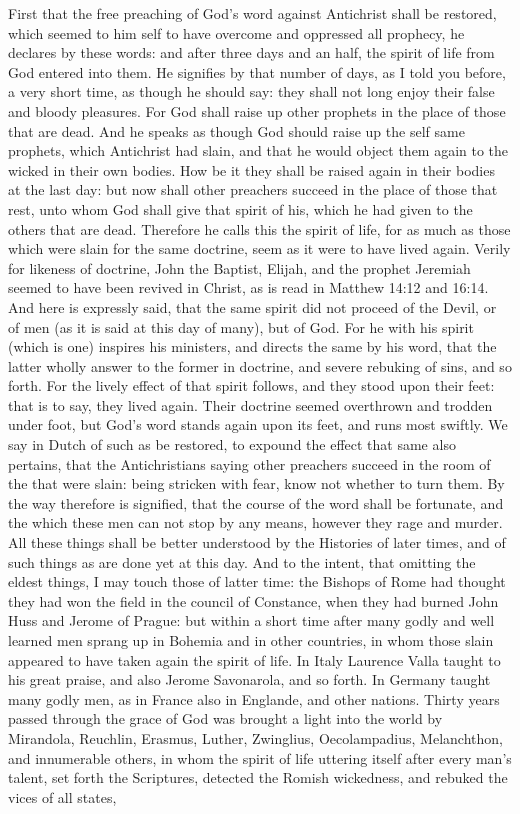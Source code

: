 First that the free preaching of God’s word against Antichrist shall be restored, which seemed to him self to have overcome and oppressed all prophecy, he declares by these words: and after three days and an half, the spirit of life from God entered into them. He signifies by that number of days, as I told you before, a very short time, as though he should say: they shall not long enjoy their false and bloody pleasures. For God shall raise up other prophets in the place of those that are dead. And he speaks as though God should raise up the self same prophets, which Antichrist had slain, and that he would object them again to the wicked in their own bodies. How be it they shall be raised again in their bodies at the last day: but now shall other preachers succeed in the place of those that rest, unto whom God shall give that spirit of his, which he had given to the others that are dead. Therefore he calls this the spirit of life, for as much as those which were slain for the same doctrine, seem as it were to have lived again. Verily for likeness of doctrine, John the Baptist, Elijah, and the prophet Jeremiah seemed to have been revived in Christ, as is read in Matthew 14:12 and 16:14. And here is expressly said, that the same spirit did not proceed of the Devil, or of men (as it is said at this day of many), but of God. For he with his spirit (which is one) inspires his ministers, and directs the same by his word, that the latter wholly answer to the former in doctrine, and severe rebuking of sins, and so forth. For the lively effect of that spirit follows, and they stood upon their feet: that is to say, they lived again. Their doctrine seemed overthrown and trodden under foot, but God’s word stands again upon its feet, and runs most swiftly. We say in Dutch of such as be restored, to expound the effect that same also pertains, that the Antichristians saying other preachers succeed in the room of the that were slain: being stricken with fear, know not whether to turn them. By the way therefore is signified, that the course of the word shall be fortunate, and the which these men can not stop by any means, however they rage and murder. All these things shall be better understood by the Histories of later times, and of such things as are done yet at this day. And to the intent, that omitting the eldest things, I may touch those of latter time: the Bishops of Rome had thought they had won the field in the council of Constance, when they had burned John Huss and Jerome of Prague: but within a short time after many godly and well learned men sprang up in Bohemia and in other countries, in whom those slain appeared to have taken again the spirit of life. In Italy Laurence Valla taught to his great praise, and also Jerome Savonarola, and so forth. In Germany taught many godly men, as in France also in Englande, and other nations. Thirty years passed through the grace of God was brought a light into the world by Mirandola, Reuchlin, Erasmus, Luther, Zwinglius, Oecolampadius, Melanchthon, and innumerable others, in whom the spirit of life uttering itself after every man’s talent, set forth the Scriptures, detected the Romish wickedness, and rebuked the vices of all states, 